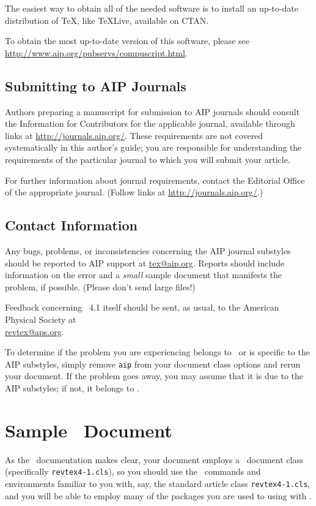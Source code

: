 \documentclass[%
 reprint,%
 amssymb, amsmath,%
 aip,cha,%
]{revtex4-1}
\begin{document}
The easiest way to obtain all of the needed software is to install an up-to-date distribution of \TeX,
like \TeX Live, available on CTAN.

To obtain the most up-to-date version of this software, please see \url{http://www.aip.org/pubservs/compuscript.html}.


\subsection{Submitting to AIP Journals}

Authors preparing a manuscript for submission to
AIP journals should consult the Information for Contributors for the applicable journal,
available through links at \url{http://journals.aip.org/}. 
These requirements are not covered systematically in this author's guide; 
you are responsible for understanding the requirements of the particular journal to which
you will submit your article.

For further information about journal requirements, contact the Editorial
Office of the appropriate journal. (Follow links at \url{http://journals.aip.org/}.)

\subsection{Contact Information}\label{sec:resources}%
Any bugs, problems, or inconsistencies concerning the AIP journal substyles
should be reported to AIP support at \href{mailto:tex@aip.org}{tex@aip.org}. 
Reports should include information on the error and a 
\textit{small} sample document that manifests the problem, if possible. 
(Please don't send large files!) 

Feedback concerning \revtex~4.1 itself should be sent, as usual, 
to the American Physical Society at\\ \href{mailto:revtex@aps.org}{revtex@aps.org}. 

To determine if the problem you are experiencing belongs to \revtex\ or is specific to the
AIP substyles, simply remove \texttt{aip} from your document class options and rerun 
your document. If the problem goes away, you may assume that it is due to the AIP substyles;
if not, it belongs to \revtex.

\section{Sample \LaTeXe\ Document}
As the \revtex\ documentation makes clear, your document employs a \LaTeXe\ document class
(specifically \texttt{revtex4-1.cls}), so you should use 
the \LaTeXe\ commands and environments familiar to you with, say, the
standard article class \texttt{revtex4-1.cls}, and you will be able to 
employ many of the packages you are used to using with \LaTeXe.
\end{document}
